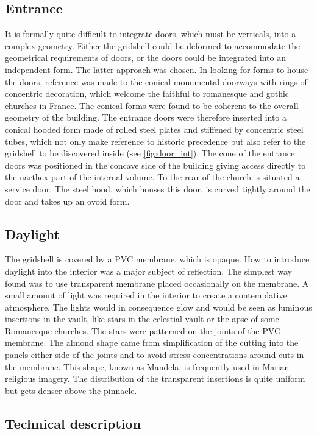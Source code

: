 \subsection{Entrance}
It is formally quite difficult to integrate doors, which must be verticals, into a complex geometry. Either the gridshell could be deformed to accommodate the geometrical requirements of doors, or the doors could be integrated into an independent form. The latter approach was chosen. In looking for forms to house the doors, reference was made to the conical monumental doorways with rings of concentric decoration, which welcome the faithful to romanesque and gothic churches in France. The conical forms were found to be coherent to the overall geometry of the building. The entrance doors were therefore inserted into a conical hooded form made of rolled steel plates and stiffened by concentric steel tubes, which not only make reference to historic precedence but also refer to the gridshell to be discovered inside (see \cref{fig:door_int}). The cone of the entrance doors was positioned in the concave side of the building giving access directly to the narthex part of the internal volume. To the rear of the church is situated a service door. The steel hood, which houses this door, is curved tightly around the door and takes up an ovoid form.

\subsection{Daylight}
The gridshell is covered by a PVC membrane, which is opaque. How to introduce daylight into the interior was a major subject of reflection. The simplest way found was to use transparent membrane placed occasionally on the membrane. A small amount of light was required in the interior to create a contemplative atmosphere. The lights would in consequence glow and would be seen as luminous insertions in the vault, like stars in the celestial vault or the apse of some Romanesque churches. The stars were patterned on the joints of the PVC membrane. The almond shape came from simplification of the cutting into the panels either side of the joints and to avoid stress concentrations around cuts in the membrane. This shape, known as Mandela, is frequently used in Marian religious imagery. The distribution of the transparent insertions is quite uniform but gets denser above the pinnacle.

\subsection{Technical description}

